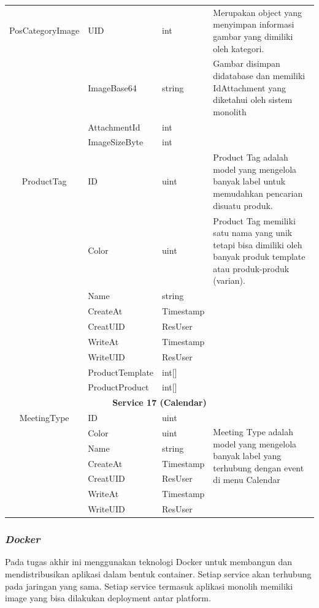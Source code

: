 \begin{longtable}{|c|p{3cm}|p{3cm}|p{4cm}|}
	\hline
	PosCategoryImage & UID & int & Merupakan object yang menyimpan informasi gambar yang dimiliki oleh kategori. \\
	\cline{2-3}
	& ImageBase64 & string & Gambar disimpan didatabase dan memiliki IdAttachment yang diketahui oleh sistem monolith\\
	\cline{2-3}
	& AttachmentId & int & \\
	\cline{2-3}
	& ImageSizeByte & int & \\

	\hline
	ProductTag & ID & uint & Product Tag adalah model yang mengelola banyak label untuk memudahkan pencarian disuatu  produk. \\
	\cline{2-3}
	& Color & uint & Product Tag memiliki satu nama yang unik tetapi bisa dimiliki oleh banyak produk template atau produk-produk (varian). \\
	\cline{2-3}
	& Name & string & \\
	\cline{2-3}
	& CreateAt & Timestamp & \\
	\cline{2-3}
	& CreatUID & ResUser & \\
	\cline{2-3}
	& WriteAt & Timestamp & \\
	\cline{2-3}
	& WriteUID & ResUser & \\
	\cline{2-3}
	& ProductTemplate & int[] & \\
	\cline{2-3}
	& ProductProduct & int[] & \\
	\hline

	\multicolumn{4}{|c|}{\textbf{Service 17 (Calendar)}} \\
	\hline
	MeetingType & ID & uint & \multirow{6}{4cm}{Meeting Type adalah model yang mengelola banyak label yang terhubung dengan event di menu Calendar} \\
	\cline{2-3}
	& Color & uint & \\
	\cline{2-3}
	& Name & string & \\
	\cline{2-3}
	& CreateAt & Timestamp & \\
	\cline{2-3}
	& CreatUID & ResUser & \\
	\cline{2-3}
	& WriteAt & Timestamp & \\
	\cline{2-3}
	& WriteUID & ResUser & \\
	\hline
\end{longtable}

\subsubsection{\textit{Docker} }
Pada tugas akhir ini menggunakan teknologi Docker untuk membangun dan mendistribusikan aplikasi dalam bentuk container. Setiap service akan terhubung pada jaringan yang sama. Setiap service termasuk aplikasi monolih memiliki image yang bisa dilakukan deployment antar platform. 

